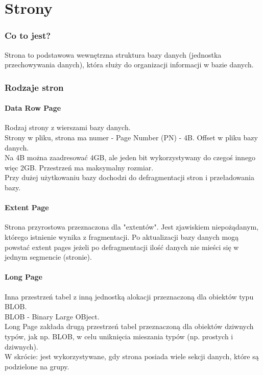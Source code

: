 \documentclass[a4paper,twoside]{article}
\begin{document}
  	\part*{Strony}
  	\section*{Co to jest?}
  	Strona to podstawowa wewnętrzna struktura bazy danych (jednostka przechowywania danych), która służy do organizacji informacji w bazie danych.
  	\section*{Rodzaje stron}
	  	\subsection*{Data Row Page}
	  	Rodzaj strony z wierszami bazy danych.\\
		Strony w pliku, strona ma numer - Page Number (PN) - 4B. Offset w pliku bazy danych.\\
		Na 4B można zaadresować 4GB, ale jeden bit wykorzystywany do czegoś innego więc 2GB. Przestrzeń ma maksymalny rozmiar.\\
		Przy dużej użytkowaniu bazy dochodzi do defragmentacji stron i przeładowania bazy.
  		\subsection*{Extent Page}
  		Strona przyrostowa przeznaczona dla "extentów". Jest zjawiskiem niepożądanym, którego istnienie wynika z fragmentacji. Po aktualizacji bazy danych mogą powstać extent pages jeżeli po defragmentacji ilość danych nie mieści się w jednym segmencie (stronie).
  		\subsection*{Long Page} 
  		Inna przestrzeń tabel z inną jednostką alokacji przeznaczoną dla obiektów typu BLOB.\\
  		BLOB - Binary Large OBject.\\
  		Long Page zakłada drugą przestrzeń tabel przeznaczoną dla obiektów dziwnych typów, jak np. BLOB, w celu uniknięcia mieszania typów (np. prostych i dziwnych).\\
  		W skrócie: jest wykorzystywane, gdy strona posiada wiele sekcji danych, które są podzielone na grupy.
\end{document}
